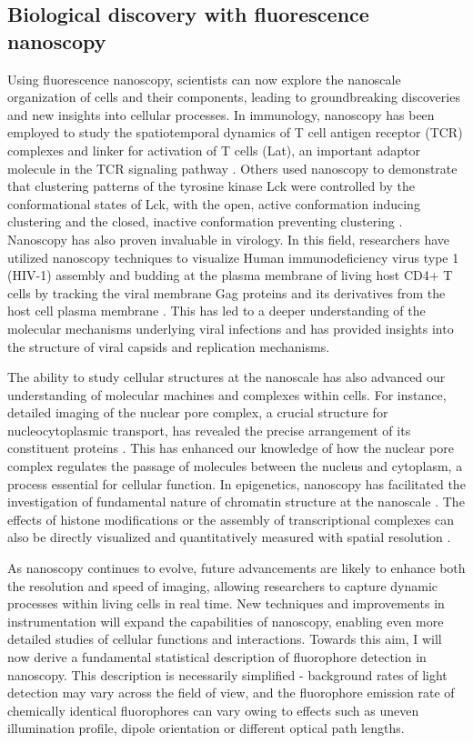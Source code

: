 \subsection{Biological discovery with fluorescence nanoscopy}

Using fluorescence nanoscopy, scientists can now explore the nanoscale organization of cells and their components, leading to groundbreaking discoveries and new insights into cellular processes. In immunology, nanoscopy has been employed to study the spatiotemporal dynamics of T cell antigen receptor (TCR) complexes and linker for activation of T cells (Lat), an important adaptor molecule in the TCR signaling pathway \parencite{Lillemeier2010}. Others used nanoscopy to demonstrate that clustering patterns of the tyrosine kinase Lck were controlled by the conformational states of Lck, with the open, active conformation inducing clustering and the closed, inactive conformation preventing clustering \parencite{Rossy2013}. Nanoscopy has also proven invaluable in virology. In this field, researchers have utilized nanoscopy techniques to visualize Human immunodeficiency virus type 1 (HIV-1) assembly and budding at the plasma membrane of living host CD4+ T cells by tracking the viral membrane Gag proteins and its derivatives from the host cell plasma membrane \parencite{Floderer2018}. This has led to a deeper understanding of the molecular mechanisms underlying viral infections and has provided insights into the structure of viral capsids and replication mechanisms.

The ability to study cellular structures at the nanoscale has also advanced our understanding of molecular machines and complexes within cells. For instance, detailed imaging of the nuclear pore complex, a crucial structure for nucleocytoplasmic transport, has revealed the precise arrangement of its constituent proteins \parencite{Wang2023}. This has enhanced our knowledge of how the nuclear pore complex regulates the passage of molecules between the nucleus and cytoplasm, a process essential for cellular function. In epigenetics, nanoscopy has facilitated the investigation of fundamental nature of chromatin structure at the nanoscale \parencite{Ricci2015}. The effects of histone modifications or the assembly of transcriptional complexes can also be directly visualized and quantitatively measured with spatial resolution \parencite{Ricci2015,Nozaki2017,Boettiger2016}.

As nanoscopy continues to evolve, future advancements are likely to enhance both the resolution and speed of imaging, allowing researchers to capture dynamic processes within living cells in real time. New techniques and improvements in instrumentation will expand the capabilities of nanoscopy, enabling even more detailed studies of cellular functions and interactions. Towards this aim, I will now derive a fundamental statistical description of fluorophore detection in nanoscopy. This description is necessarily simplified - background rates of light detection may vary across the field of view, and the fluorophore emission rate of chemically identical fluorophores can vary owing to effects such as uneven illumination profile, dipole orientation or different optical path lengths.



